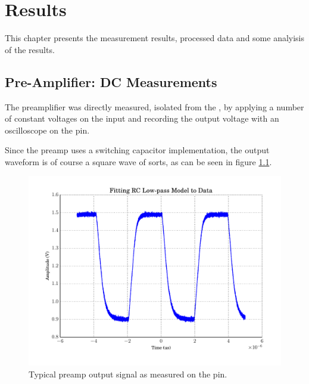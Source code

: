 \chapter{Results}
\label{chap:results}

This  chapter  presents  the  measurement results,  processed  data  and  some
analyisis of the results.


\section{Pre-Amplifier: DC Measurements}
\label{sec:preAmpDC}

The preamplifier was directly  measured, isolated from the \sdm, by applying a
number of constant voltages on the input and recording the output voltage with
an oscilloscope on the  pin.

Since the  preamp  uses  a  switching  capacitor  implementation,  the  output
waveform is of  course  a  square  wave  of  sorts,  as  can be seen in figure
\ref{fig:preamp_waveform}.

\begin{figure}
    \centering
    \includegraphics[width=\linewidth]{images/plots/preamp_waveform.pdf}
    \caption{Typical preamp output signal as measured on the  pin.}
    \label{fig:preamp_waveform}
\end{figure}

